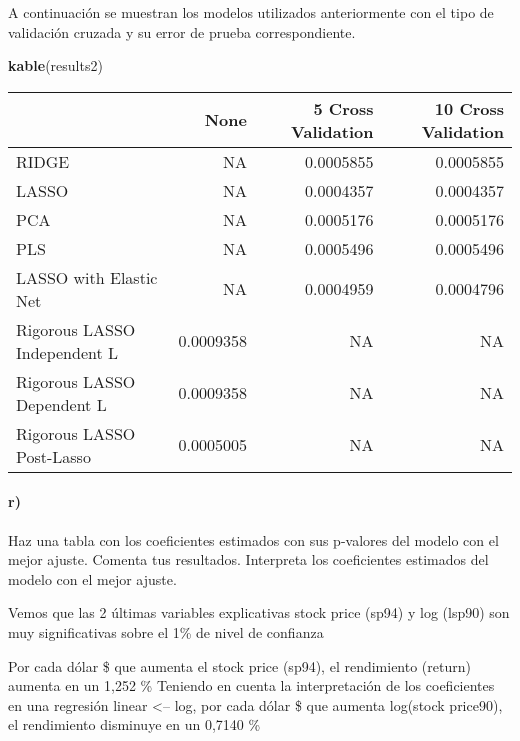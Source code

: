 \documentclass[]{article}
\newenvironment{Shaded}{\begin{snugshade}}{\end{snugshade}}
\newcommand{\KeywordTok}[1]{\textcolor[rgb]{0.13,0.29,0.53}{\textbf{#1}}}
\newcommand{\NormalTok}[1]{#1}
\let\oldparagraph\paragraph
\renewcommand{\paragraph}[1]{\oldparagraph{#1}\mbox{}}
\begin{document}
A continuación se muestran los modelos utilizados anteriormente con el
tipo de validación cruzada y su error de prueba correspondiente.

\begin{Shaded}
\begin{Highlighting}[]
\KeywordTok{kable}\NormalTok{(results2)}
\end{Highlighting}
\end{Shaded}

\begin{longtable}[]{@{}lrrr@{}}
\toprule
& None & 5 Cross Validation & 10 Cross Validation\tabularnewline
\midrule
\endhead
RIDGE & NA & 0.0005855 & 0.0005855\tabularnewline
LASSO & NA & 0.0004357 & 0.0004357\tabularnewline
PCA & NA & 0.0005176 & 0.0005176\tabularnewline
PLS & NA & 0.0005496 & 0.0005496\tabularnewline
LASSO with Elastic Net & NA & 0.0004959 & 0.0004796\tabularnewline
Rigorous LASSO Independent L & 0.0009358 & NA & NA\tabularnewline
Rigorous LASSO Dependent L & 0.0009358 & NA & NA\tabularnewline
Rigorous LASSO Post-Lasso & 0.0005005 & NA & NA\tabularnewline
\bottomrule
\end{longtable}

\paragraph{r)}\label{r}

Haz una tabla con los coeficientes estimados con sus p-valores del
modelo con el mejor ajuste. Comenta tus resultados. Interpreta los
coeficientes estimados del modelo con el mejor ajuste.

Vemos que las 2 últimas variables explicativas stock price (sp94) y log
(lsp90) son muy significativas sobre el 1\% de nivel de confianza

Por cada dólar \$ que aumenta el stock price (sp94), el rendimiento
(return) aumenta en un 1,252 \% Teniendo en cuenta la interpretación de
los coeficientes en una regresión linear \textless{}-- log, por cada
dólar \$ que aumenta log(stock price90), el rendimiento disminuye en un
0,7140 \%
\end{document}
